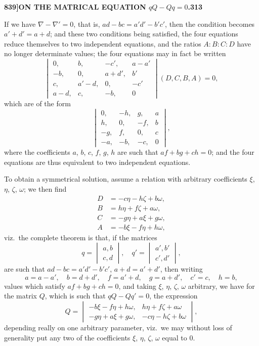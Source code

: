 \documentclass[12pt,a4paper]{article}
\theoremstyle{definition}
\begin{document}
\newpage
\setcounter{page}{313}

\noindent\textbf{839]}\hfill\textbf{ON THE MATRICAL EQUATION $qQ - Qq = 0$.}\hfill\textbf{313}

\bigskip

\noindent If we have $\nabla - \nabla' = 0$, that is, $ad - bc = a'd' - b'c'$, then the condition becomes $a' + d' = a + d$; and these two conditions being satisfied, the four equations reduce themselves to two independent equations, and the ratios $A : B : C : D$ have no longer determinate values; the four equations may in fact be written
\[
\begin{vmatrix} 0, & b, & -c', & a - a' \\ -b, & 0, & a + d', & b' \\ c, & a' - d, & 0, & -c' \\ a - d, & c, & -b, & 0 \end{vmatrix} (D, C, B, A) = 0,
\]
which are of the form
\[
\begin{vmatrix} 0, & -h, & g, & a \\ h, & 0, & -f, & b \\ -g, & f, & 0, & c \\ -a, & -b, & -c, & 0 \end{vmatrix},
\]
where the coefficients $a$, $b$, $c$, $f$, $g$, $h$ are such that $af + bg + ch = 0$; and the four equations are thus equivalent to two independent equations.

To obtain a symmetrical solution, assume a relation with arbitrary coefficients $\xi$, $\eta$, $\zeta$, $\omega$; we then find
\begin{align*}
D &= -c\eta - h\zeta + b\omega, \\
B &= h\eta + f\zeta + a\omega, \\
C &= -g\eta + a\xi + g\omega, \\
A &= -b\xi - f\eta + h\omega,
\end{align*}
viz.\ the complete theorem is that, if the matrices
\[
q = \begin{vmatrix} a, b \\ c, d \end{vmatrix}, \quad q' = \begin{vmatrix} a', b' \\ c', d' \end{vmatrix},
\]
are such that $ad - bc = a'd' - b'c'$, $a + d = a' + d'$, then writing
\[
a = a - a', \quad b = d + d', \quad f = a' + d, \quad g = a + d', \quad c' = c, \quad h = b,
\]
values which satisfy $af + bg + ch = 0$, and taking $\xi$, $\eta$, $\zeta$, $\omega$ arbitrary, we have for the matrix $Q$, which is such that $qQ - Qq' = 0$, the expression
\[
Q = \begin{vmatrix} -b\xi - f\eta + h\omega, & h\eta + f\zeta + a\omega \\ -g\eta + a\xi + g\omega, & -c\eta - h\zeta + b\omega \end{vmatrix},
\]
depending really on one arbitrary parameter, viz.\ we may without loss of generality put any two of the coefficients $\xi$, $\eta$, $\zeta$, $\omega$ equal to 0.
\end{document}
